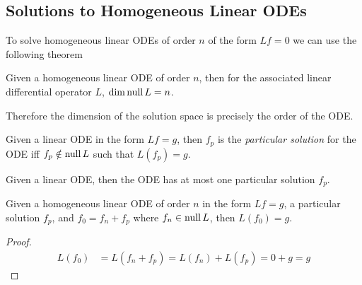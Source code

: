\documentclass[notes]{subfiles}
\begin{document}
\subsection{Solutions to Homogeneous Linear ODEs}
To solve homogeneous linear ODEs of order $n$ of the form $Lf = 0$ we can use the following theorem
\begin{theorem}
    Given a homogeneous linear ODE of order $n$, then for the associated linear differential operator $L$, $\dim \operatorname{null} L = n$.
\end{theorem}
Therefore the dimension of the solution space is precisely the order of the ODE.

\begin{definition}
    Given a linear ODE in the form $Lf = g$, then $f_p$ is the \textsl{particular solution} for the ODE iff $f_p \notin \operatorname{null} L$ such that $L(f_p) = g$.
\end{definition}

\begin{theorem}
    Given a linear ODE, then the ODE has at most one particular solution $f_p$. 
\end{theorem}

\begin{lemma}
    Given a homogeneous linear ODE of order $n$ in the form $Lf = g$, a particular solution $f_p$, and $f_0 = f_n + f_p$ where $f_n \in \operatorname{null} L$, then $L(f_0) = g$.
\end{lemma}
\begin{proof}
    \begin{align*}
        L(f_0)
        &= L(f_n + f_p)
        = L(f_n) + L(f_p)
        = 0 + g
        = g
    \end{align*}
\end{proof}
\end{document}
